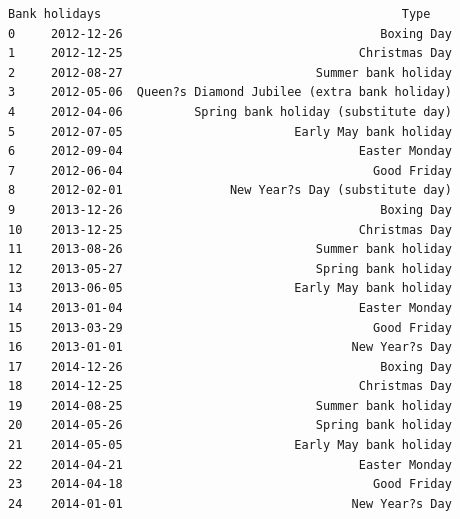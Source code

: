 \documentclass[11pt]{article}
\makeatletter
\newcommand{\boxspacing}{\kern\kvtcb@left@rule\kern\kvtcb@boxsep}
\newcommand{\prompt}[4]{
        {\ttfamily\llap{{\color{#2}[#3]:\hspace{3pt}#4}}\vspace{-\baselineskip}}
    }
\makeatother
\begin{document}
            \begin{tcolorbox}[breakable, size=fbox, boxrule=.5pt, pad at break*=1mm, opacityfill=0]
\prompt{Out}{outcolor}{77}{\boxspacing}
\begin{Verbatim}[commandchars=\\\{\}]
   Bank holidays                                          Type
0     2012-12-26                                    Boxing Day
1     2012-12-25                                 Christmas Day
2     2012-08-27                           Summer bank holiday
3     2012-05-06  Queen?s Diamond Jubilee (extra bank holiday)
4     2012-04-06          Spring bank holiday (substitute day)
5     2012-07-05                        Early May bank holiday
6     2012-09-04                                 Easter Monday
7     2012-06-04                                   Good Friday
8     2012-02-01               New Year?s Day (substitute day)
9     2013-12-26                                    Boxing Day
10    2013-12-25                                 Christmas Day
11    2013-08-26                           Summer bank holiday
12    2013-05-27                           Spring bank holiday
13    2013-06-05                        Early May bank holiday
14    2013-01-04                                 Easter Monday
15    2013-03-29                                   Good Friday
16    2013-01-01                                New Year?s Day
17    2014-12-26                                    Boxing Day
18    2014-12-25                                 Christmas Day
19    2014-08-25                           Summer bank holiday
20    2014-05-26                           Spring bank holiday
21    2014-05-05                        Early May bank holiday
22    2014-04-21                                 Easter Monday
23    2014-04-18                                   Good Friday
24    2014-01-01                                New Year?s Day
\end{Verbatim}
\end{tcolorbox}
        
\end{document}
